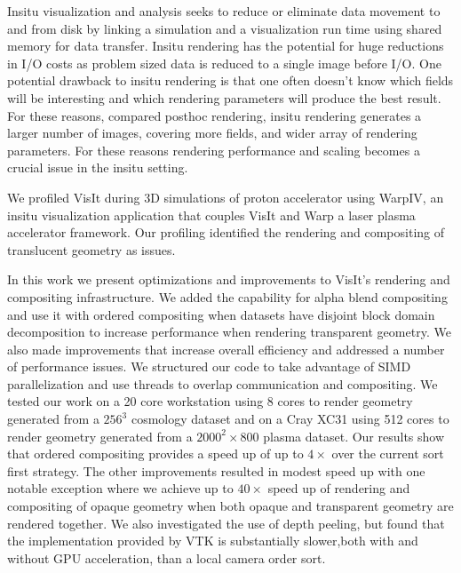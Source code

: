 \documentclass[a4paper,10pt]{report}
\begin{document}
Insitu visualization and analysis seeks to reduce or eliminate data movement to and from disk by linking a simulation and a visualization run time using shared memory for data transfer. Insitu rendering has the potential for huge reductions in I/O costs as problem sized data is reduced to a single image before I/O. One potential drawback to insitu rendering is that one often doesn't know which fields will be interesting and which rendering parameters will produce the best result. For these reasons, compared posthoc rendering, insitu rendering generates a larger number of images, covering more fields, and wider array of rendering parameters. For these reasons rendering performance and scaling becomes a crucial issue in the insitu setting.

We profiled VisIt during 3D simulations of proton accelerator using WarpIV, an insitu visualization application that couples VisIt and Warp a laser plasma accelerator framework. Our profiling identified the rendering and compositing of translucent geometry as issues.

In this work we present optimizations and improvements to VisIt's rendering and compositing infrastructure. We added the capability for alpha blend compositing and use it with ordered compositing when datasets have disjoint block domain decomposition to increase performance when rendering transparent geometry. We also made improvements that increase overall efficiency and addressed a number of performance issues. We structured our code to take advantage of SIMD parallelization and use threads to overlap communication and compositing. We tested our work on a 20 core workstation using 8 cores to render geometry generated from a $256^3$ cosmology dataset and on a Cray XC31 using 512 cores to render geometry generated from a $2000^2 \times 800$ plasma dataset. Our results show that ordered compositing provides a speed up of up to $4 \times$ over the current sort first strategy. The other improvements resulted in modest speed up with one notable exception where we achieve up to $40 \times$ speed up of rendering and compositing of opaque geometry when both opaque and transparent geometry are rendered together. We also investigated the use of depth peeling, but found that the implementation provided by VTK is substantially slower,both with and without GPU acceleration, than a local camera order sort.
\end{document}
